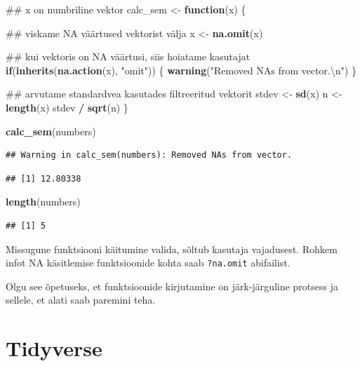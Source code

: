 \documentclass[]{book}
\newenvironment{Shaded}{\begin{snugshade}}{\end{snugshade}}
\newcommand{\KeywordTok}[1]{\textcolor[rgb]{0.13,0.29,0.53}{\textbf{#1}}}
\newcommand{\CharTok}[1]{\textcolor[rgb]{0.31,0.60,0.02}{#1}}
\newcommand{\StringTok}[1]{\textcolor[rgb]{0.31,0.60,0.02}{#1}}
\newcommand{\ControlFlowTok}[1]{\textcolor[rgb]{0.13,0.29,0.53}{\textbf{#1}}}
\newcommand{\OperatorTok}[1]{\textcolor[rgb]{0.81,0.36,0.00}{\textbf{#1}}}
\newcommand{\NormalTok}[1]{#1}
\begin{document}
\begin{Shaded}
\begin{Highlighting}[]
\NormalTok{## x on numbriline vektor}
\NormalTok{calc_sem <-}\StringTok{ }\ControlFlowTok{function}\NormalTok{(x) \{}
  
\NormalTok{  ## viskame NA väärtused vektorist välja}
\NormalTok{  x <-}\StringTok{ }\KeywordTok{na.omit}\NormalTok{(x)}
  
\NormalTok{  ## kui vektoris on NA väärtusi, siis hoiatame kasutajat}
  \ControlFlowTok{if}\NormalTok{(}\KeywordTok{inherits}\NormalTok{(}\KeywordTok{na.action}\NormalTok{(x), }\StringTok{"omit"}\NormalTok{)) \{}
    \KeywordTok{warning}\NormalTok{(}\StringTok{"Removed NAs from vector.}\CharTok{\textbackslash{}n}\StringTok{"}\NormalTok{)}
\NormalTok{  \}}
  
\NormalTok{  ## arvutame standardvea kasutades filtreeritud vektorit}
\NormalTok{  stdev <-}\StringTok{ }\KeywordTok{sd}\NormalTok{(x)}
\NormalTok{  n <-}\StringTok{ }\KeywordTok{length}\NormalTok{(x)}
\NormalTok{  stdev }\OperatorTok{/}\StringTok{ }\KeywordTok{sqrt}\NormalTok{(n)}
\NormalTok{\}}

\KeywordTok{calc_sem}\NormalTok{(numbers)}
\end{Highlighting}
\end{Shaded}

\begin{verbatim}
## Warning in calc_sem(numbers): Removed NAs from vector.
\end{verbatim}

\begin{verbatim}
## [1] 12.80338
\end{verbatim}

\begin{Shaded}
\begin{Highlighting}[]
\KeywordTok{length}\NormalTok{(numbers)}
\end{Highlighting}
\end{Shaded}

\begin{verbatim}
## [1] 5
\end{verbatim}

Missugune funktsiooni käitumine valida, sõltub kasutaja vajadusest.
Rohkem infot NA käsitlemise funktsioonide kohta saab \texttt{?na.omit}
abifailist.

Olgu see õpetuseks, et funktsioonide kirjutamine on järk-järguline
protsess ja sellele, et alati saab paremini teha.

\chapter{Tidyverse}\label{tidyverse}
\end{document}
